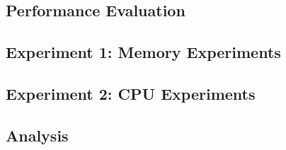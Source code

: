 \documentclass[11pt, a4paper]{article}
\begin{document}
\begin{multicols*}{2}




\section{Performance Evaluation}




\subsection{Experiment 1: Memory Experiments}


\subsection{Experiment 2: CPU Experiments}


\subsection{Analysis}


\end{multicols*}
\end{document}
